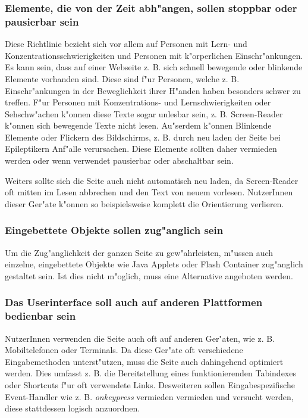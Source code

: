 \documentclass[a4paper,bibtotoc,oneside]{scrbook}
\begin{document}
\subsubsection{Elemente, die von der Zeit abh"angen, sollen stoppbar oder pausierbar sein}
Diese Richtlinie bezieht sich vor allem auf Personen mit Lern- und Konzentrationsschwierigkeiten und Personen mit k"orperlichen Einschr"ankungen. Es kann sein, dass auf einer Webseite z. B. sich schnell bewegende oder blinkende Elemente vorhanden sind. Diese sind f"ur Personen, welche z. B. Einschr"ankungen in der Beweglichkeit ihrer H"anden haben besonders schwer zu treffen. F"ur Personen mit Konzentrations- und Lernschwierigkeiten oder Sehschw"achen k"onnen diese Texte sogar unlesbar sein, z. B. Screen-Reader k"onnen sich bewegende Texte nicht lesen. \cite[Abschnitt 6.7]{wcag1}
Au"serdem k"onnen Blinkende Elemente oder Flickern des Bildschirms, z. B. durch neu laden der Seite bei Epileptikern Anf"alle verursachen.
Diese Elemente sollten daher vermieden werden oder wenn verwendet pausierbar oder abschaltbar sein. \cite[S. 45]{barr_webd}

Weiters sollte sich die Seite auch nicht automatisch neu laden, da Screen-Reader oft mitten im Lesen abbrechen und den Text von neuem vorlesen. NutzerInnen dieser Ger"ate k"onnen so beispielsweise komplett die Orientierung verlieren. \cite[S. 45]{barr_webd}

\subsubsection{Eingebettete Objekte sollen zug"anglich sein}
Um die Zug"anglichkeit der ganzen Seite zu gew"ahrleisten, m"ussen auch einzelne, eingebettete Objekte wie Java Applets oder Flash Container zug"anglich gestaltet sein. Ist dies nicht m"oglich, muss eine Alternative angeboten werden. \cite[Abschnitt 6.8]{wcag1}

\subsubsection{Das Userinterface soll auch auf anderen Plattformen bedienbar sein}
NutzerInnen verwenden die Seite auch oft auf anderen Ger"aten, wie z. B. Mobiltelefonen oder Terminals. Da diese Ger"ate oft verschiedene Eingabemethoden unterst"utzen, muss die Seite auch dahingehend optimiert werden. Dies umfasst z. B. die Bereitstellung eines funktionierenden Tabindexes oder Shortcuts f"ur oft verwendete Links. Desweiteren sollen Eingabespezifische Event-Handler wie z. B. \emph{onkeypress} vermieden vermieden und versucht werden, diese stattdessen logisch anzuordnen. \cite[Abschnitt 6.9]{wcag1}
\end{document}
